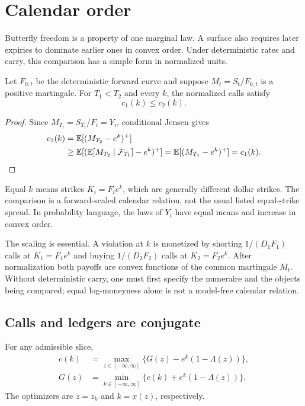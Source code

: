 \section{Calendar order}
\label{sec:calendar}

Butterfly freedom is a property of one marginal law.  A surface also requires
later expiries to dominate earlier ones in convex order.  Under deterministic
rates and carry, this comparison has a simple form in normalized units.

\begin{lemma}
\label{lem:caljensen}
Let $F_{0,t}$ be the deterministic forward curve and suppose
$M_t=S_t/F_{0,t}$ is a positive martingale.  For $T_1<T_2$ and every $k$,
the normalized calls satisfy
\begin{equation}
c_1(k)\le c_2(k).
\label{eq:calreq}
\end{equation}
\end{lemma}

\begin{proof}
Since $M_{T_i}=S_{T_i}/F_i=Y_i$, conditional Jensen gives
\[
\begin{aligned}
c_2(k)
&=\mathbb{E}[(M_{T_2}-e^k)^+]\\
&\ge\mathbb{E}[(\mathbb{E}[M_{T_2}\mid\mathcal F_{T_1}]-e^k)^+]
=\mathbb{E}[(M_{T_1}-e^k)^+]=c_1(k).
\end{aligned}
\]
\end{proof}

Equal $k$ means strikes $K_i=F_i e^k$, which are generally different dollar
strikes.  The comparison is a forward-scaled calendar relation, not the usual
listed equal-strike spread.  In probability language, the laws of $Y_i$ have
equal means and increase in convex order.

The scaling is essential.  A violation at $k$ is monetized by shorting
$1/(D_1F_1)$ calls at $K_1=F_1e^k$ and buying $1/(D_2F_2)$ calls at
$K_2=F_2e^k$.  After normalization both payoffs are convex functions of the
common martingale $M_t$.  Without deterministic carry, one must first specify
the numeraire and the objects being compared; equal log-moneyness alone is not
a model-free calendar relation.

\subsection{Calls and ledgers are conjugate}

\begin{lemma}
\label{lem:conjugacy}
For any admissible slice,
\begin{equation}
\begin{aligned}
c(k)&=\max_{z\in[-\infty,\infty]}
\{G(z)-e^k(1-\Lambda(z))\},\\
G(z)&=\min_{k\in[-\infty,\infty]}
\{c(k)+e^k(1-\Lambda(z))\}.
\end{aligned}
\label{eq:conjugacy}
\end{equation}
The optimizers are $z=z_k$ and $k=x(z)$, respectively.
\end{lemma}

